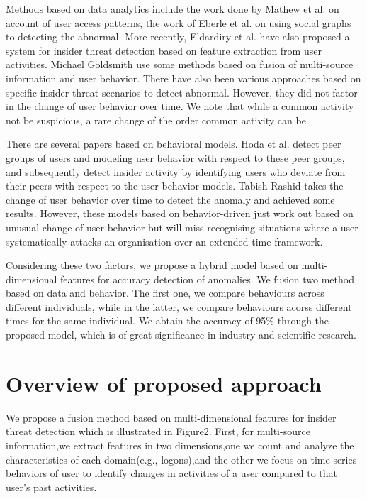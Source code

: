 \documentclass[conference]{IEEEtran}
\begin{document}
Methods based on data analytics include the work done by Mathew et al.\cite{b13} on account of user access patterns, the work of Eberle et al. \cite{b14} on using social graphs to detecting the abnormal. More recently, Eldardiry et al. \cite{b15} have also proposed a system for insider threat detection based on feature extraction from user activities. Michael Goldsmith use some methods based on fusion of multi-source information and user behavior\cite{b16}. There have also been various approaches based on specific insider threat scenarios to detect abnormal\cite{b7}\cite{b8}. 
However, they did not factor in the change of user behavior over time. We note that while a common activity not be suspicious, a rare change of the order  common activity can be.

There are several papers based on behavioral models\cite{b10}\cite{b11}\cite{b12}. Hoda et al. \cite{b13}detect peer groups of users and modeling user behavior with respect to these peer groups, and subsequently detect insider activity by identifying users who deviate from their peers with respect to the user behavior models. 
Tabish Rashid \cite{b37} takes the change of user behavior  over time to detect the anomaly and achieved some results. However, these models based on behavior-driven just work out based on unusual change of user behavior but will miss recognising situations where a user systematically attacks an
organisation over an extended time-framework.

Considering these two factors, we propose 
a hybrid model based on multi-dimensional features for accuracy detection of anomalies.
We fusion two method based on data and behavior.
The first one, we compare behaviours across different individuals, while in the latter, we compare behaviours acorss different times for the same individual.  
We abtain the accuracy of 95\% through the proposed model, which is of great significance in industry and scientific research.





\section{Overview of proposed approach}
\iffalse
We propose a fusion method based on multi-dimensional features for insider threat detection which is illustrated in Figure2. First, for multi-source information,we extract features in two dimensions,one we count and analyze the characteristics of each domain(e.g., logons),and the other we focus on time-series behaviors of user to identify changes in activities of a user compared to that user’s past activities.
\end{document}
